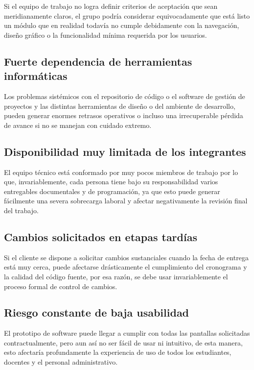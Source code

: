 \documentclass[11pt,spanish]{article}
\begin{document}
Si el equipo de trabajo no logra definir criterios de aceptación que sean meridianamente claros, el grupo podría considerar equivocadamente que está listo un módulo que en realidad todavía no cumple debidamente con la navegación, diseño gráfico o la funcionalidad mínima requerida por los usuarios.

\subsection{Fuerte dependencia de herramientas informáticas}

Los problemas sistémicos con el repositorio de código o el software de gestión de proyectos y las distintas herramientas de diseño o del ambiente de desarrollo, pueden generar enormes retrasos operativos o incluso una irrecuperable pérdida de avance si no se manejan con cuidado extremo.

\subsection{Disponibilidad muy limitada de los integrantes}

El equipo técnico está conformado por muy pocos miembros de trabajo por lo que, invariablemente, cada persona tiene bajo su responsabilidad varios entregables documentales y de programación, ya que esto puede generar fácilmente una severa sobrecarga laboral y afectar negativamente la revisión final del trabajo.

\subsection{Cambios solicitados en etapas tardías}

Si el cliente se dispone a solicitar cambios sustanciales cuando la fecha de entrega está muy cerca, puede afectarse drásticamente el cumplimiento del cronograma y la calidad del código fuente, por esa razón, se debe usar invariablemente el proceso formal de control de cambios.

\subsection{Riesgo constante de baja usabilidad}

El prototipo de software puede llegar a cumplir con todas las pantallas solicitadas contractualmente, pero aun así no ser fácil de usar ni intuitivo, de esta manera, esto afectaría profundamente la experiencia de uso de todos los estudiantes, docentes y el personal administrativo.
\end{document}
